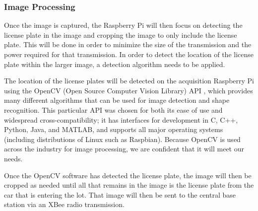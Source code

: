 \documentclass[11pt, oneside, fullpage, doublespace]{article}
\begin{document}
\subsubsection{Image Processing}
Once the image is captured, the Raspberry Pi will then focus on detecting the license plate in the image and cropping the image to only include the license plate. This will be done in order to minimize the size of the transmission and the power required for that transmission. In order to detect the location of the license plate within the larger image, a detection algorithm needs to be applied.

The location of the license plates will be detected on the acquisition Raspberry Pi using the OpenCV (Open Source Computer Vision Library) API \cite{openCV}, which provides many different algorithms that can be used for image detection and shape recognition. This particular API was chosen for both its ease of use and widespread cross-compatibility; it has interfaces for development in C, C++, Python, Java, and MATLAB, and supports all major operating systems (including distributions of Linux such as Raspbian). Because OpenCV is used across the industry for image processing, we are confident that it will meet our needs.

Once the OpenCV software has detected the license plate, the image will then be cropped as needed until all that remains in the image is the license plate from the car that is entering the lot. That image will then be sent to the central base station via an XBee radio transmission.
\end{document}
